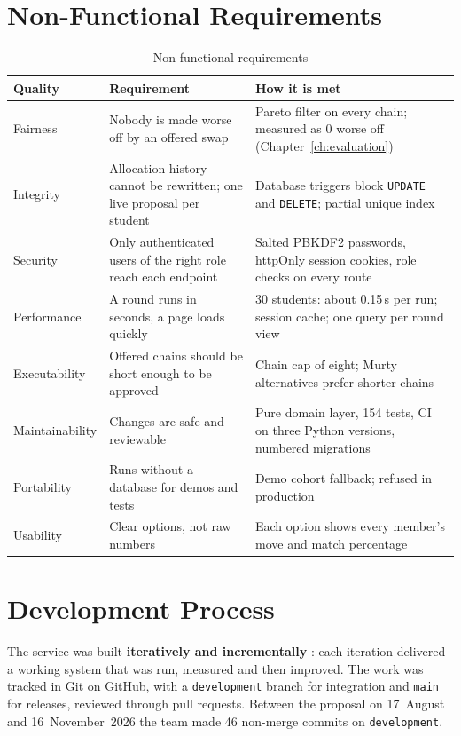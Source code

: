\section{Non-Functional Requirements}

\begin{table}[H]
\centering
\small
\begin{tabularx}{\textwidth}{>{\raggedright\arraybackslash}p{} L L}
\toprule
\textbf{Quality} & \textbf{Requirement} & \textbf{How it is met} \\
\midrule
Fairness & Nobody is made worse off by an offered swap & Pareto filter on every chain; measured as 0 worse off (Chapter~\ref{ch:evaluation}) \\
Integrity & Allocation history cannot be rewritten; one live proposal per student & Database triggers block \texttt{UPDATE} and \texttt{DELETE}; partial unique index \\
Security & Only authenticated users of the right role reach each endpoint & Salted PBKDF2 passwords, httpOnly session cookies, role checks on every route \\
Performance & A round runs in seconds, a page loads quickly & 30 students: about 0.15\,s per run; session cache; one query per round view \\
Executability & Offered chains should be short enough to be approved & Chain cap of eight; Murty alternatives prefer shorter chains \\
Maintainability & Changes are safe and reviewable & Pure domain layer, 154 tests, CI on three Python versions, numbered migrations \\
Portability & Runs without a database for demos and tests & Demo cohort fallback; refused in production \\
Usability & Clear options, not raw numbers & Each option shows every member's move and match percentage \\
\bottomrule
\end{tabularx}
\caption{Non-functional requirements}
\label{tab:nfr}
\end{table}

\section{Development Process}

The service was built \textbf{iteratively and incrementally}
\cite{sommerville2016se}: each iteration delivered a working system that
was run, measured and then improved. The work was tracked in Git on
GitHub, with a \texttt{development} branch for integration and
\texttt{main} for releases, reviewed through pull requests. Between the
proposal on 17~August and 16~November~2026 the team made 46 non-merge
commits on \texttt{development}.

